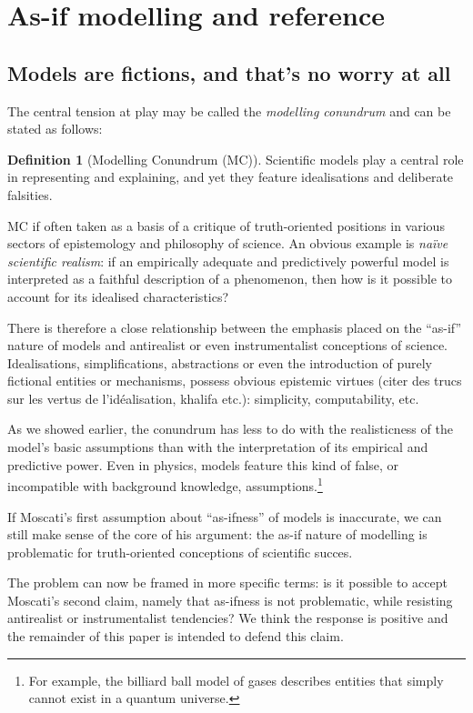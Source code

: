 \documentclass[a4paper,11pt]{article}
\theoremstyle{definition}
\newtheorem{definition}{Definition}
\begin{document}
\section{As-if modelling and reference}
\label{sec:asifVerifJust}

\subsection{Models are fictions, and that's no worry at all}

The central tension at play may be called the \textit{modelling conundrum} and can be stated as follows:

\begin{definition}[Modelling Conundrum (MC)]
    Scientific models play a central role in representing and explaining, and yet they feature idealisations and deliberate falsities.
\end{definition}

MC if often taken as a basis of a critique of truth-oriented positions in various sectors of epistemology and philosophy of science. An obvious example is \textit{naïve scientific realism}: if an empirically adequate and predictively powerful model is interpreted as a faithful description of a phenomenon, then how is it possible to account for its idealised characteristics?

There is therefore a close relationship between the emphasis placed on the ``as-if'' nature of models and antirealist or even instrumentalist conceptions of science. Idealisations, simplifications, abstractions or even the introduction of purely fictional entities or mechanisms, possess obvious epistemic virtues (citer des trucs sur les vertus de l'idéalisation, khalifa etc.): simplicity, computability, etc.

As we showed earlier, the conundrum has less to do with the realisticness of the model's basic assumptions than with the interpretation of its empirical and predictive power. Even in physics, models feature this kind of false, or incompatible with background knowledge, assumptions.\footnote{For example, the billiard ball model of gases describes entities that simply cannot exist in a quantum universe.}

If Moscati's first assumption about ``as-ifness'' of models is inaccurate, we can still make sense of the core of his argument: the as-if nature of modelling is problematic for truth-oriented conceptions of scientific succes.

The problem can now be framed in more specific terms: is it possible to accept Moscati's second claim, namely that as-ifness is not problematic, while resisting antirealist or instrumentalist tendencies? We think the response is positive and the remainder of this paper is intended to defend this claim.
\end{document}
